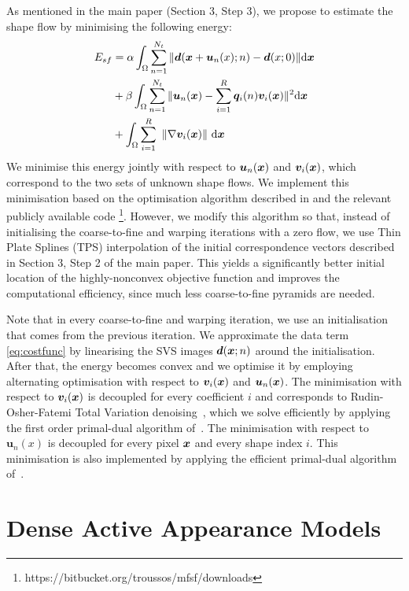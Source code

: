 As mentioned in the main paper (Section 3, Step 3), we propose to estimate the shape flow by minimising the following energy:
\vspace{-5pt}
\begin{align}
E_{sf} & =\alpha
\int_{\Omega}\sum_{n=1}^{N_t} \|\bm{d}(\bx+\bm{u}_n(x);n)-\bm{d}(x;0)\| \ud \bx \label{eq:costfunc}\\
    &+ \beta \int_{\Omega}\sum_{n=1}^{N_t}\|\bm{u}_n(\bx)-\sum_{i=1}^R\bm{q}_i(n)\bm{v}_i(\bx)\|^2 \ud \bx \label{eq:lowrank}\\
    &+
\int_\Omega  \sum_{i=1}^R \,\, \left \|    \nabla \bm{v}_i(\bx)    \right \|  \,\ud \bx \label{eq:TVterm}
\vspace{-5pt}
\end{align}
We minimise this energy jointly with respect to $\bm{u}_n(\boldsymbol{x})$ and $\bm{v}_i(\boldsymbol{x})$, which correspond to the
two sets of unknown shape flows.
We implement this minimisation based on the optimisation algorithm described in \cite{Garg:2013hu} and the relevant publicly available code \footnote{https://bitbucket.org/troussos/mfsf/downloads}.
However, we modify this algorithm so that, instead of initialising the coarse-to-fine and warping iterations with a zero flow, we use Thin Plate Splines (TPS) \cite{Bookstein1989} interpolation of the initial correspondence vectors described in Section 3, Step 2 of the main paper.
This yields a significantly better initial location of the highly-nonconvex objective function and improves the computational efficiency, since much less coarse-to-fine pyramids are needed.

Note that in every coarse-to-fine and warping iteration, we use an initialisation that comes from the previous iteration. We approximate the data term \eqref{eq:costfunc} by linearising the SVS images $\bm{d}(\boldsymbol{x};n)$ around the initialisation. After that, the energy becomes convex and we optimise it by employing alternating optimisation with respect to $\bm{v}_i(\boldsymbol{x})$ and $\bm{u}_n(\boldsymbol{x})$. The minimisation with respect to $\bm{v}_i(\boldsymbol{x})$ is decoupled for every coefficient $i$ and corresponds to Rudin-Osher-Fatemi Total Variation denoising~\cite{rudin92}, which we solve efficiently by applying the first order primal-dual algorithm of~\cite{Chambolle:Pock:JMIV2011}. The minimisation with respect to $\bm{u}_n(x)$ is decoupled for every pixel $\boldsymbol{x}$ and every shape index $i$. This minimisation is also implemented by applying the efficient primal-dual algorithm of~\cite{Chambolle:Pock:JMIV2011}.

\section{Dense Active Appearance Models}
\label{sec:daam}

